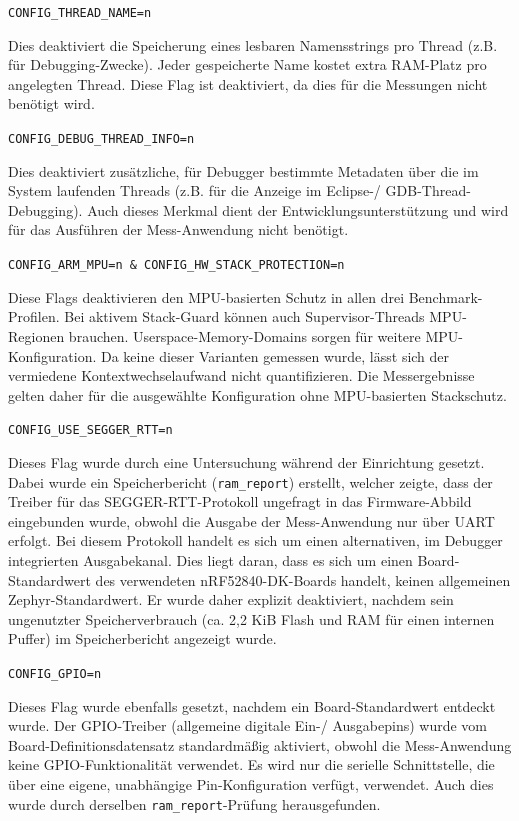 \lstinline[style=fileinline]|CONFIG_THREAD_NAME=n|

Dies deaktiviert die Speicherung eines lesbaren Namensstrings pro Thread (z.B. f{\"u}r Debugging-Zwecke). Jeder gespeicherte Name kostet extra RAM-Platz pro angelegten Thread. Diese Flag ist deaktiviert, da dies f{\"u}r die Messungen nicht ben{\"o}tigt wird.

\lstinline[style=fileinline]|CONFIG_DEBUG_THREAD_INFO=n|

Dies deaktiviert zus{\"a}tzliche, f{\"u}r Debugger bestimmte Metadaten {\"u}ber die im System laufenden Threads (z.B. f{\"u}r die Anzeige im Eclipse-/ GDB-Thread-Debugging). Auch dieses Merkmal dient der Entwicklungsunterst{\"u}tzung und wird f{\"u}r das Ausf{\"u}hren der Mess-Anwendung nicht ben{\"o}tigt.

\lstinline[style=fileinline]|CONFIG_ARM_MPU=n & CONFIG_HW_STACK_PROTECTION=n|

Diese Flags deaktivieren den MPU-basierten Schutz in allen drei Benchmark-Profilen. Bei aktivem Stack-Guard k{\"o}nnen auch Supervisor-Threads MPU-Regionen brauchen. Userspace-Memory-Domains sorgen f{\"u}r weitere MPU-Konfiguration. Da keine dieser Varianten gemessen wurde, l{\"a}sst sich der vermiedene Kontextwechselaufwand nicht quantifizieren. Die Messergebnisse gelten daher f{\"u}r die ausgew{\"a}hlte Konfiguration ohne MPU-basierten Stackschutz.

\lstinline[style=fileinline]|CONFIG_USE_SEGGER_RTT=n|

Dieses Flag wurde durch eine Untersuchung w{\"a}hrend der Einrichtung gesetzt. Dabei wurde ein Speicherbericht (\lstinline[style=fileinline]|ram_report|) erstellt, welcher zeigte, dass der Treiber f{\"u}r das SEGGER-RTT-Protokoll ungefragt in das Firmware-Abbild eingebunden wurde, obwohl die Ausgabe der Mess-Anwendung nur {\"u}ber UART erfolgt. Bei diesem Protokoll handelt es sich um einen alternativen, im Debugger integrierten Ausgabekanal. Dies liegt daran, dass es sich um einen Board-Standardwert des verwendeten nRF52840-DK-Boards handelt, keinen allgemeinen Zephyr-Standardwert. Er wurde daher explizit deaktiviert, nachdem sein ungenutzter Speicherverbrauch (ca. 2,2 KiB Flash und RAM f{\"u}r einen internen Puffer) im Speicherbericht angezeigt wurde.

\lstinline[style=fileinline]|CONFIG_GPIO=n|

Dieses Flag wurde ebenfalls gesetzt, nachdem ein Board-Standardwert entdeckt wurde. Der GPIO-Treiber (allgemeine digitale Ein-/ Ausgabepins) wurde vom Board-Definitionsdatensatz standardm{\"a}{\ss}ig aktiviert, obwohl die Mess-Anwendung keine GPIO-Funktionalit{\"a}t verwendet. Es wird nur die serielle Schnittstelle, die {\"u}ber eine eigene, unabh{\"a}ngige Pin-Konfiguration verf{\"u}gt, verwendet. Auch dies wurde durch derselben \lstinline[style=fileinline]|ram_report|-Pr{\"u}fung herausgefunden.

